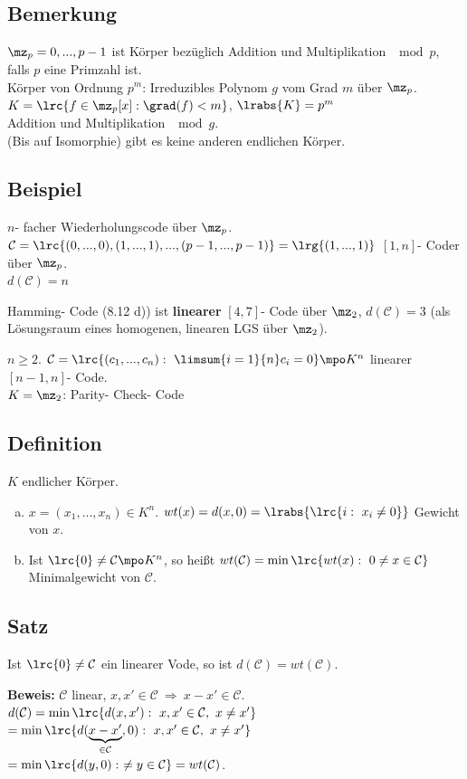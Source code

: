 	\subsection{Bemerkung}
		$ \mz_p={0,...,p-1} $ ist Körper bezüglich Addition und Multiplikation $ \mod p $, falls $ p $ eine Primzahl ist.\\
		Körper von Ordnung $ p^m $: Irreduzibles Polynom $ g $ vom Grad $ m $ über $ \mz_p $.\\
		$ K=\lrc{f\in\mz_p[x]:\grad(f)<m} $, $ \lrabs{K}=p^m $\\
		Addition und Multiplikation $ \mod g $.\\
		(Bis auf Isomorphie) gibt es keine anderen endlichen Körper.
		
	\subsection{Beispiel}
		\item $ n $- facher Wiederholungscode über $ \mz_p $.\\
		$ \mathcal{C}=\lrc{(0,...,0),(1,...,1),...,(p-1,...,p-1)}=\lrg{(1,...,1)} $ $ [1,n] $- Coder über $ \mz_p $.\\
		$ d(\mathcal{C})=n $
		\item Hamming- Code (8.12 d)) ist \textbf{linearer} $ [4,7] $- Code über $ \mz_2 $, $ d(\mathcal{C})=3 $ (als Lösungsraum eines homogenen, linearen LGS über $ \mz_2 $).
		\item $ n\geq 2 $. $ \mathcal{C}=\lrc{(c_1,...,c_n):\ \limsum{i=1}{n}c_i=0}\mpo K^n $ linearer $ [n-1,n] $- Code.\\
		$ K=\mz_2 $: Parity- Check- Code
		\subExEnd
		
	\subsection{Definition}
		$ K $ endlicher Körper.
		\begin{enumerate}[a)]
			\item $ x= (x_1,...,x_n)\in K^n$. $ wt(x)=d(x,0)=\lrabs{\lrc{i:\ x_i\neq 0}} $ Gewicht von $ x $.
			\item Ist $ \lrc{0}\neq\mathcal{C}\mpo K^n $, so heißt $ wt(\mathcal{C})=\min\lrc{wt(x):\ 0\neq x\in\mathcal{C}} $\\
			Minimalgewicht von $ \mathcal{C} $.
		\end{enumerate}
		
	\subsection{Satz}
		Ist $ \lrc{0}\neq\mathcal{C} $ ein linearer Vode, so ist $ d(\mathcal{C})=wt(\mathcal{C}) $.
		
		\textbf{Beweis:} $ \mathcal{C} $ linear, $ x,x'\in\mathcal{C}\ \Rightarrow\ x-x'\in\mathcal{C} $.\\
		$ d(\mathcal{C})=\min\lrc{d(x,x'):\ x,x'\in\mathcal{C},\ x\neq x'} $\\
		$ =\min\lrc{d(\underbrace{x-x'}_{\in\mathcal{C}},0):\ x,x'\in\mathcal{C},\ x\neq x'} $\\
		$ =\min\lrc{d(y,0):\  \neq y\in\mathcal{C}}=wt(\mathcal{C}) $.